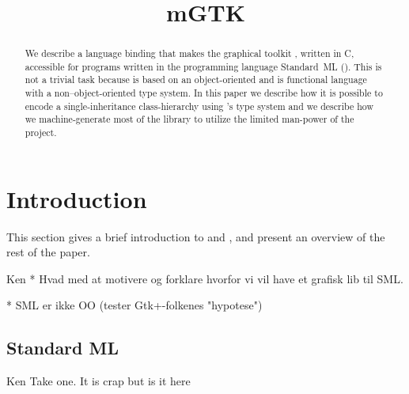 \documentclass[workingdraft,endnotes]{usetex-v1}
\begin{document}
\title{mGTK}


\author{
\and
{}
%
} %

\maketitle

\DefineShortVerb{\!}

\begin{abstract}
  We describe \mgtk a language binding that makes the graphical
  toolkit \gtk, written in C, accessible for programs written in the
  programming language Standard~ML (\sml).  This is not a trivial task
  because \gtk is based on an object-oriented and \sml is functional
  language with a non--object-oriented type system.  In this paper we
  describe how it is possible to encode a single-inheritance
  class-hierarchy using \sml's type system and we describe how we
  machine-generate most of the library to utilize the limited
  man-power of the project.
\end{abstract}



\section{Introduction}
\label{sec:intr-backgr}

This section gives a brief introduction to \sml and \gtk, and present
an overview of the rest of the paper.

\begin{ednote}{Ken}
  * Hvad med at motivere og forklare hvorfor vi vil have et grafisk lib
  til SML.

  * SML er ikke OO (tester Gtk+-folkenes "hypotese")
\end{ednote}

\subsection{Standard ML}

\begin{ednote}{Ken}
  Take one.  It is crap but is it here
\end{ednote}
\end{document}
